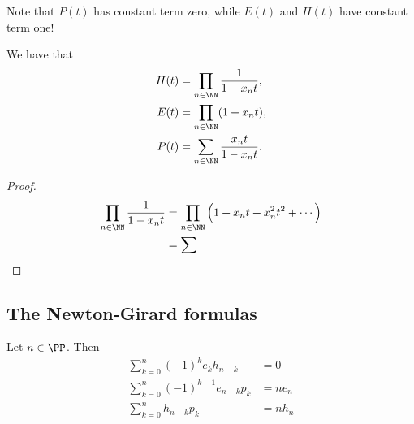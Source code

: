 \documentclass{article}
\begin{document}
Note that $P(t)$ has constant term zero, while $E(t)$ and $H(t)$ have constant term one!

\begin{theorem}\label{thm:HEPPowerSeries}
    We have that
    \begin{align*}
        H(t) &= \prod_{n\in\NN}\frac{1}{1-x_nt}, \\
        E(t) &= \prod_{n\in\NN}(1+x_nt), \\
        P(t) &= \sum_{n\in\NN}\frac{x_nt}{1-x_nt}.
    \end{align*}
\end{theorem}

\begin{proof}
    \begin{align*}
        \prod_{n\in\NN}\frac{1}{1-x_nt} &= \prod_{n\in\NN}\Big(1 + x_nt + x_n^2t^2 + \cdots\Big) \\
                                        &= \sum
    \end{align*}
\end{proof}

\subsection{The Newton-Girard formulas}

\begin{theorem}
    Let $n \in \PP$. Then
    \begin{align}
        \sum_{k=0}^n (-1)^k e_kh_{n-k} &= 0 \label{ng1} \\
        \sum_{k=0}^n (-1)^{k-1} e_{n-k}p_k &= ne_n  \label{ng2} \\
        \sum_{k=0}^n h_{n-k}p_k &= nh_n \label{ng3}
    \end{align}
\end{theorem}
\end{document}
